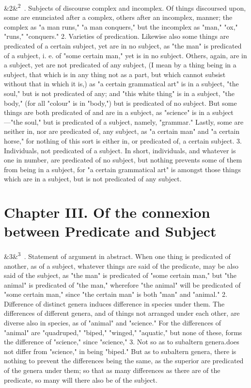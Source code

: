 \documentclass[12pt]{article}
\newcommand{\para}[1][]{\par\noindent\ifx&#1&\else\textsuperscript{\footnotesize #1}~\fi}
\begin{document}
\para[2] 1. Subjects of discourse complex and incomplex. Of things discoursed upon, some are enunciated after a complex, others after an incomplex, manner; the complex as "a man runs," "a man conquers," but the incomplex as "man," "ox," "runs," "conquers." 2. Varieties of predication. Likewise also some things are predicated of a certain subject, yet are in no subject, as "the man" is predicated of a subject, i. e. of "some certain man," yet is in no subject. Others, again, are in a subject, yet are not predicated of any subject, (I mean by a thing being in a subject, that which is in any thing not as a part, but which cannot subsist without that in which it is,) as "a certain grammatical art" is in a subject, "the soul," but is not predicated of any; and "this white thing" is in a subject, "the body," (for all "colour" is in "body,") but is predicated of no subject. But some things are both predicated of and are in a subject, as "science" is in a subject---"the soul," but is predicated of a subject, namely, "grammar." Lastly, some are neither in, nor are predicated of, any subject, as "a certain man" and "a certain horse," for nothing of this sort is either in, or predicated of, a certain subject. 3. Individuals, not predicated of a subject. In short, individuals, and whatever is one in number, are predicated of no subject, but nothing prevents some of them from being in a subject, for "a certain grammatical art" is amongst those things which are in a subject, but is not predicated of any subject.

\section*{Chapter III. Of the connexion between Predicate and Subject}

\para[3] 1. Statement of argument in abstract. When one thing is predicated of another, as of a subject, whatever things are said of the predicate, may be also said of the subject, as "the man" is predicated of "some certain man," but "the animal" is predicated of "the man," wherefore "the animal" will be predicated of "some certain man," since "the certain man" is both "man" and "animal." 2. Difference of distinct genera induces difference in species under them. The differences of different genera, and of things not arranged under each other, are diverse also in species, as of "animal" and "science." For the differences of "animal" are "quadruped," "biped," "winged," "aquatic," but none of these, forms the difference of "science," since "science," 3. Not so as to subaltern genera.does not differ from "science," in being "biped." But as to subaltern genera, there is nothing to prevent the differences being the same, as the superior are predicated of the genera under them; so that as many differences as there are of the predicate, so many will there also be of the subject.
\end{document}
